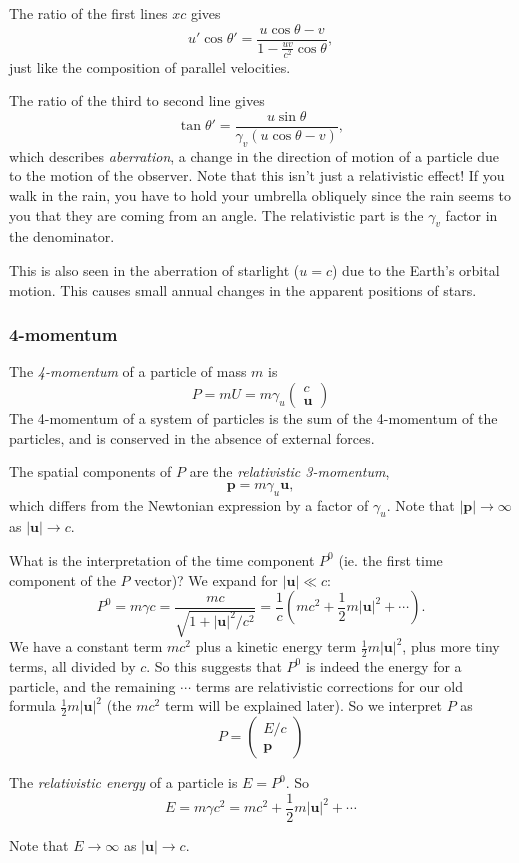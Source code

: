 \documentclass[a4paper]{article}
\begin{document}
The ratio of the first lines $xc$ gives
\[
  u'\cos \theta' = \frac{u\cos \theta - v}{1 - \frac{uv}{c^2}\cos \theta},
\]
just like the composition of parallel velocities.

The ratio of the third to second line gives
\[
  \tan \theta'  = \frac{u\sin \theta}{\gamma_v(u\cos \theta - v)},
\]
which describes \emph{aberration}, a change in the direction of motion of a particle due to the motion of the observer. Note that this isn't just a relativistic effect! If you walk in the rain, you have to hold your umbrella obliquely since the rain seems to you that they are coming from an angle. The relativistic part is the $\gamma_v$ factor in the denominator.

This is also seen in the aberration of starlight ($u = c$) due to the Earth's orbital motion. This causes small annual changes in the apparent positions of stars.
\subsubsection*{4-momentum}
\begin{defi}[4-momentum]
  The \emph{4-momentum} of a particle of mass $m$ is
  \[
    P = mU = m\gamma_u
    \begin{pmatrix}
      c\\
      \mathbf{u}
    \end{pmatrix}
  \]
  The 4-momentum of a system of particles is the sum of the 4-momentum of the particles, and is conserved in the absence of external forces.

  The spatial components of $P$ are the \emph{relativistic 3-momentum},
  \[
    \mathbf{p} = m\gamma_u \mathbf{u},
  \]
  which differs from the Newtonian expression by a factor of $\gamma_u$. Note that $|\mathbf{p}| \to \infty$ as $|\mathbf{u}| \to c$.
\end{defi}

What is the interpretation of the time component $P^0$ (ie. the first time component of the $P$ vector)? We expand for $|\mathbf{u}| \ll c$:
\[
  P^0 = m\gamma c = \frac{mc}{\sqrt{1 + |\mathbf{u}|^2/c^2}} = \frac{1}{c}\left(mc^2 + \frac{1}{2}m|\mathbf{u}|^2 + \cdots\right).
\]
We have a constant term $mc^2$ plus a kinetic energy term $\frac{1}{2}m|\mathbf{u}|^2$, plus more tiny terms, all divided by $c$. So this suggests that $P^0$ is indeed the energy for a particle, and the remaining $\cdots$ terms are relativistic corrections for our old formula $\frac{1}{2}m|\mathbf{u}|^2$ (the $mc^2$ term will be explained later). So we interpret $P$ as
\[
  P = 
  \begin{pmatrix}
    E/c\\
    \mathbf{p}
  \end{pmatrix}
\]
\begin{defi}
  The \emph{relativistic energy} of a particle is $E = P^0$. So
  \[
    E = m\gamma c^2 = mc^2 + \frac{1}{2}m|\mathbf{u}|^2 + \cdots
  \]
\end{defi}
Note that $E\to \infty$ as $|\mathbf{u}| \to c$.
\end{document}
